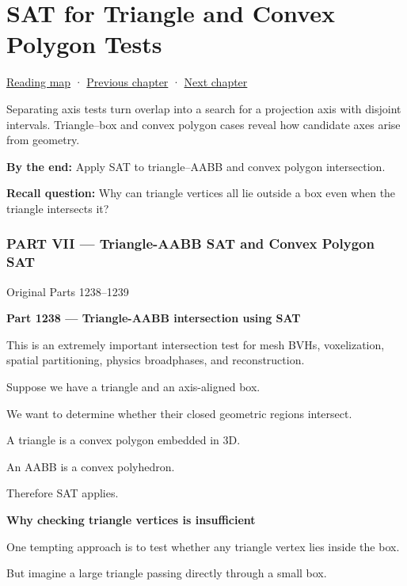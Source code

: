 \chapter{SAT for Triangle and Convex Polygon Tests}\label{04-visual-computing-ii-ch025-sat-for-triangle-and-convex-polygon-tests}\hypertarget{04-visual-computing-ii-ch025}{}\label{stagechapter:04-visual-computing-ii-ch025}

\hyperref[volume-reading-map]{Reading map} · \hyperref[04-visual-computing-ii-ch024-raytriangle-intersection]{Previous chapter} · \hyperref[04-visual-computing-ii-ch026-contact-features-and-manifolds]{Next chapter}

Separating axis tests turn overlap into a search for a projection axis with disjoint intervals. Triangle--box and convex polygon cases reveal how candidate axes arise from geometry.

\textbf{By the end:} Apply SAT to triangle--AABB and convex polygon intersection.

\textbf{Recall question:} Why can triangle vertices all lie outside a box even when the triangle intersects it?

\subsection{PART VII --- Triangle-AABB SAT and Convex Polygon SAT}\label{04-visual-computing-ii-ch025-part-vii-triangle-aabb-sat-and-convex-polygon-sat}

Original Parts 1238--1239

\textbf{Part 1238 --- Triangle-AABB intersection using SAT}

This is an extremely important intersection test for mesh BVHs, voxelization, spatial partitioning, physics broadphases, and reconstruction.

Suppose we have a triangle and an axis-aligned box.

We want to determine whether their closed geometric regions intersect.

A triangle is a convex polygon embedded in 3D.

An AABB is a convex polyhedron.

Therefore SAT applies.

\textbf{Why checking triangle vertices is insufficient}

One tempting approach is to test whether any triangle vertex lies inside the box.

But imagine a large triangle passing directly through a small box.

